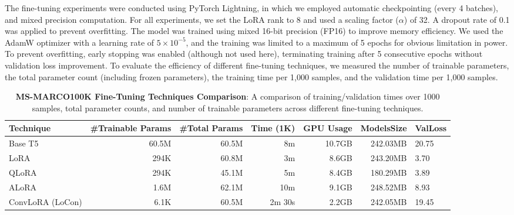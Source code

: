 The fine-tuning experiments were conducted using PyTorch Lightning, in which we employed automatic checkpointing (every 4 batches), and mixed precision computation. For all experiments, we set the LoRA rank to 8 and used a scaling factor (\(\alpha\)) of 32. A dropout rate of 0.1 was applied to prevent overfitting. The model was trained using mixed 16-bit precision (FP16) to improve memory efficiency. We used the AdamW optimizer with a learning rate of \(5 \times 10^{-5}\), and the training was limited to a maximum of 5 epochs for obvious limitation in power. To prevent overfitting, early stopping was enabled (although not used here), terminating training after 5 consecutive epochs without validation loss improvement. 
To evaluate the efficiency of different fine-tuning techniques, we measured the number of trainable parameters, the total parameter count (including frozen parameters), the training time per 1,000 samples, and the validation time per 1,000 samples.

\begin{table}[ht]
    \centering
    \small
    \begin{tabular}{l|rrrrr}
    \toprule
    \textbf{Technique} & \textbf{\#Trainable Params} & \textbf{\#Total Params} & \textbf{Time (1K)} & \textbf{GPU Usage} & \textbf{ModelsSize} & \textbf{ValLoss}\\
    \midrule
    Base T5         & 60.5M & 60.5M & 8m & 10.7GB & 242.03MB & 20.75\\
    LoRA            & 294K & 60.8M & 3m & 8.6GB & 243.20MB & 3.70\\
    QLoRA           & 294K & 45.1M & 5m & 8.4GB & 180.29MB & 3.89\\
    ALoRA           & 1.6M & 62.1M & 10m & 9.1GB & 248.52MB & 8.93\\
    ConvLoRA (LoCon)& 6.1K & 60.5M & 2m 30s & 2.2GB & 242.05MB & 19.45\\
    \bottomrule
    \end{tabular}
    \caption{\textbf{MS-MARCO100K Fine-Tuning Techniques Comparison}: A comparison of training/validation times over 1000 samples, total parameter counts, and number of trainable parameters across different fine-tuning techniques.}
    \label{tab:results_comparison}
\end{table}


